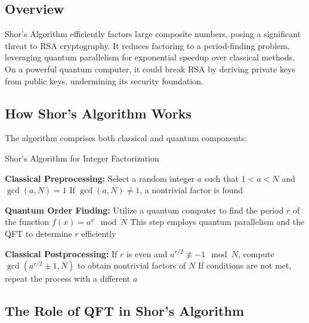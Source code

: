 \documentclass{article}
\begin{document}
\subsection{Overview}

Shor's Algorithm efficiently factors large composite numbers, posing a significant threat to RSA cryptography. It reduces factoring to a period-finding problem, leveraging quantum parallelism for exponential speedup over classical methods. On a powerful quantum computer, it could break RSA by deriving private keys from public keys, undermining its security foundation.

\subsection{How Shor's Algorithm Works}

The algorithm comprises both classical and quantum components:

\begin{algorithm}[H]
    \caption{Shor's Algorithm for Integer Factorization}
    \begin{algorithmic}[1]
        \State \textbf{Classical Preprocessing:}
        \State \hspace{0.5cm} Select a random integer $a$ such that $1 < a < N$ and $\gcd(a, N) = 1$
        \State \hspace{0.5cm} If $\gcd(a, N) \neq 1$, a nontrivial factor is found

        \State \textbf{Quantum Order Finding:}
        \State \hspace{0.5cm} Utilize a quantum computer to find the period $r$ of the function $f(x) = a^x \mod N$
        \State \hspace{0.5cm} This step employs quantum parallelism and the QFT to determine $r$ efficiently

        \State \textbf{Classical Postprocessing:}
        \State \hspace{0.5cm} If $r$ is even and $a^{r/2} \not\equiv -1 \mod N$, compute $\gcd(a^{r/2} \pm 1, N)$ to obtain nontrivial factors of $N$
        \State \hspace{0.5cm} If conditions are not met, repeat the process with a different $a$
    \end{algorithmic}
\end{algorithm}

\subsection{The Role of QFT in Shor's Algorithm}
\end{document}
